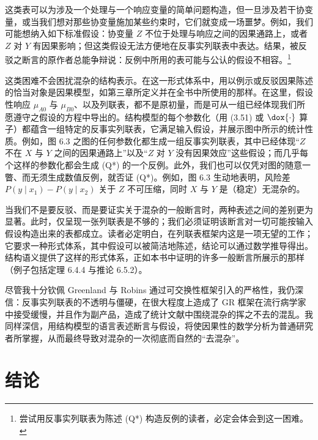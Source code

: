 这类表可以为涉及一个处理与一个响应变量的简单问题构造，但一旦涉及若干协变量，或当我们想对那些协变量施加某些约束时，它们就变成一场噩梦。例如，我们可能想纳入如下标准假设：协变量 $Z$ 不位于处理与响应之间的因果通路上，或者 $Z$ 对 $Y$ 有因果影响；但这类假设无法方便地在反事实列联表中表达。结果，被反驳之断言的原作者总能争辩说：反例中所用的表可能与公认的假设不相容。\footnote{尝试用反事实列联表为陈述 (Q*) 构造反例的读者，必定会体会到这一困难。}

这类困难不会困扰混杂的结构表示。在这一形式体系中，用以例示或反驳因果陈述的恰当对象是因果模型，如第三章所定义并在全书中所使用的那样。在这里，假设性响应 $\mu_{A0}$ 与 $\mu_{B0}$、以及列联表，都不是原初量，而是可从一组已经体现我们所愿遵守之假设的方程中导出的。结构模型的每个参数化（用 \textup{(3.51)} 或 $\dox{\cdot}$ 算子）都蕴含一组特定的反事实列联表，它满足输入假设，并展示图中所示的统计性质。例如，图 6.3 之图的任何参数化都生成一组反事实列联表，其中已经体现“$Z$ 不在 $X$ 与 $Y$ 之间的因果通路上”以及“$Z$ 对 $Y$ 没有因果效应”这些假设；而几乎每个这样的参数化都会生成 (Q*) 的一个反例。此外，我们也可以仅凭对图的随意一瞥、而无须生成数值反例，就否证 (Q*)。例如，图 6.3 生动地表明，风险差 $P(y\mid x_1)-P(y\mid x_2)$ 关于 $Z$ 不可压缩，同时 $X$ 与 $Y$ 是（稳定）无混杂的。

当我们不是要反驳、而是要证实关于混杂的一般断言时，两种表述之间的差别更为显著。此时，仅呈现一张列联表是不够的；我们必须证明该断言对一切可能按输入假设构造出来的表都成立。读者必定明白，在列联表框架内这是一项无望的工作；它要求一种形式体系，其中假设可以被简洁地陈述，结论可以通过数学推导得出。结构语义提供了这样的形式体系，正如本书中证明的许多一般断言所展示的那样（例子包括定理 6.4.4 与推论 6.5.2）。

尽管我十分钦佩 Greenland 与 Robins 通过可交换性框架引入的严格性，我仍深信：反事实列联表的不透明与僵硬，在很大程度上造成了 GR 框架在流行病学家中接受缓慢，并且作为副产品，造成了统计文献中围绕混杂的挥之不去的混乱。我同样深信，用结构模型的语言表述断言与假设，将使因果性的数学分析为普通研究者所掌握，从而最终导致对混杂的一次彻底而自然的“去混杂”。

\section{结论}

